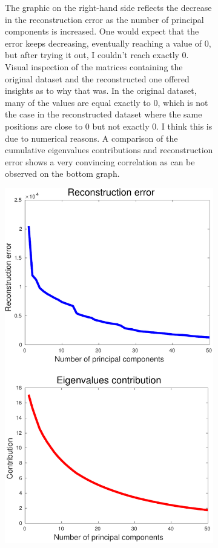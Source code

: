 \documentclass[11pt, a4paper]{article}
\begin{document}
\begin{figure}[H]
    \centering
    \begin{subfigure}[b]{.6\textwidth}
      The graphic on the right-hand side reflects the decrease in the
      reconstruction error as the number of principal components is
      increased. One would expect that the error keeps decreasing,
      eventually reaching a value of 0, but after trying it out, I
      couldn't reach exactly 0. Visual inspection of the matrices
      containing the original dataset and the reconstructed one
      offered insights as to why that was. In the original dataset,
      many of the values are equal exactly to 0, which is not the case
      in the reconstructed dataset where the same positions are close
      to 0 but not exactly 0. I think this is due to numerical
      reasons. A comparison of the cumulative eigenvalues
      contributions and reconstruction error shows a very convincing
      correlation as can be observed on the bottom graph.
    \end{subfigure}%
    \begin{subfigure}{.4\textwidth}
      \vspace{-140pt}
      \centering
      \includegraphics[width=0.75\linewidth]{unsupervised_reconstruction_error.pdf}
    \end{subfigure}
\end{figure}
\end{document}
